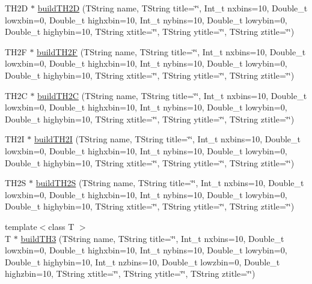 \begin{DoxyCompactItemize}
\item 
T\-H2\-D $\ast$ \hyperlink{namespace_h_a_l_aeb630f07e99d3e1f7c2963e733fb1994}{build\-T\-H2\-D} (T\-String name, T\-String title=\char`\"{}\char`\"{}, Int\-\_\-t nxbins=10, Double\-\_\-t lowxbin=0, Double\-\_\-t highxbin=10, Int\-\_\-t nybins=10, Double\-\_\-t lowybin=0, Double\-\_\-t highybin=10, T\-String xtitle=\char`\"{}\char`\"{}, T\-String ytitle=\char`\"{}\char`\"{}, T\-String ztitle=\char`\"{}\char`\"{})
\item 
T\-H2\-F $\ast$ \hyperlink{namespace_h_a_l_a5943318187a6b7f012ababfb95056ac0}{build\-T\-H2\-F} (T\-String name, T\-String title=\char`\"{}\char`\"{}, Int\-\_\-t nxbins=10, Double\-\_\-t lowxbin=0, Double\-\_\-t highxbin=10, Int\-\_\-t nybins=10, Double\-\_\-t lowybin=0, Double\-\_\-t highybin=10, T\-String xtitle=\char`\"{}\char`\"{}, T\-String ytitle=\char`\"{}\char`\"{}, T\-String ztitle=\char`\"{}\char`\"{})
\item 
T\-H2\-C $\ast$ \hyperlink{namespace_h_a_l_a59fdb2d6800cc9438744400700453c0b}{build\-T\-H2\-C} (T\-String name, T\-String title=\char`\"{}\char`\"{}, Int\-\_\-t nxbins=10, Double\-\_\-t lowxbin=0, Double\-\_\-t highxbin=10, Int\-\_\-t nybins=10, Double\-\_\-t lowybin=0, Double\-\_\-t highybin=10, T\-String xtitle=\char`\"{}\char`\"{}, T\-String ytitle=\char`\"{}\char`\"{}, T\-String ztitle=\char`\"{}\char`\"{})
\item 
T\-H2\-I $\ast$ \hyperlink{namespace_h_a_l_ae41203cecd0351be222b3fc729b3c8dc}{build\-T\-H2\-I} (T\-String name, T\-String title=\char`\"{}\char`\"{}, Int\-\_\-t nxbins=10, Double\-\_\-t lowxbin=0, Double\-\_\-t highxbin=10, Int\-\_\-t nybins=10, Double\-\_\-t lowybin=0, Double\-\_\-t highybin=10, T\-String xtitle=\char`\"{}\char`\"{}, T\-String ytitle=\char`\"{}\char`\"{}, T\-String ztitle=\char`\"{}\char`\"{})
\item 
T\-H2\-S $\ast$ \hyperlink{namespace_h_a_l_a8e459c6c5a2375f74f89987abefdee23}{build\-T\-H2\-S} (T\-String name, T\-String title=\char`\"{}\char`\"{}, Int\-\_\-t nxbins=10, Double\-\_\-t lowxbin=0, Double\-\_\-t highxbin=10, Int\-\_\-t nybins=10, Double\-\_\-t lowybin=0, Double\-\_\-t highybin=10, T\-String xtitle=\char`\"{}\char`\"{}, T\-String ytitle=\char`\"{}\char`\"{}, T\-String ztitle=\char`\"{}\char`\"{})
\item 
{\footnotesize template$<$class T $>$ }\\T $\ast$ \hyperlink{namespace_h_a_l_a02169d3addb34058f91af082963a56ef}{build\-T\-H3} (T\-String name, T\-String title=\char`\"{}\char`\"{}, Int\-\_\-t nxbins=10, Double\-\_\-t lowxbin=0, Double\-\_\-t highxbin=10, Int\-\_\-t nybins=10, Double\-\_\-t lowybin=0, Double\-\_\-t highybin=10, Int\-\_\-t nzbins=10, Double\-\_\-t lowzbin=0, Double\-\_\-t highzbin=10, T\-String xtitle=\char`\"{}\char`\"{}, T\-String ytitle=\char`\"{}\char`\"{}, T\-String ztitle=\char`\"{}\char`\"{})

\end{DoxyCompactItemize}
